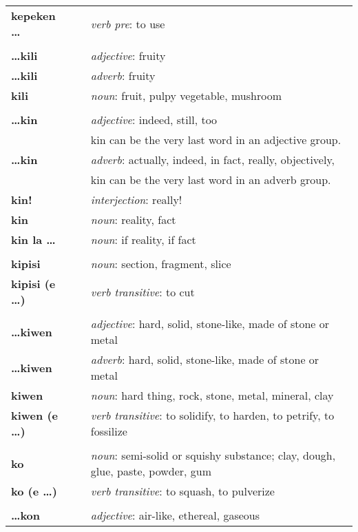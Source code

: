 \begin{supertabular}{p{2,5cm}|ll}
\textbf{kepeken \dots} && \textit{verb pre}: to use \\ 
 && \\ %
\textbf{\dots kili} && \textit{adjective}: fruity \\ 
\textbf{\dots kili} && \textit{adverb}: fruity \\ 
\textbf{kili} && \textit{noun}: fruit, pulpy vegetable, mushroom \\ 
 && \\ %
\textbf{\dots kin} && \textit{adjective}: indeed, still, too \\ && kin can be the very last word in an adjective group. \\ 
\textbf{\dots kin} && \textit{adverb}: actually, indeed, in fact, really, objectively, \\ && kin can be the very last word in an adverb group. \\
\textbf{kin!} && \textit{interjection}: really! \\ 
\textbf{kin} && \textit{noun}: reality, fact \\  
\textbf{kin la \dots} && \textit{noun}: if reality, if fact \\  
 && \\ %
\textbf{kipisi } && \textit{noun}: section, fragment, slice \\ 
\textbf{kipisi (e \dots)} && \textit{verb transitive}: to cut \\ 
 && \\ %
\textbf{\dots kiwen} && \textit{adjective}: hard, solid, stone-like, made of stone or metal \\ 
\textbf{\dots kiwen} && \textit{adverb}: hard, solid, stone-like, made of stone or metal \\ 
\textbf{kiwen} && \textit{noun}: hard thing, rock, stone, metal, mineral, clay \\ 
\textbf{kiwen (e \dots)} && \textit{verb transitive}: to solidify, to harden, to petrify, to fossilize \\ 
 && \\ %
\textbf{ko} && \textit{noun}: semi-solid or squishy substance; clay, dough, glue, paste, powder, gum \\ 
\textbf{ko (e \dots)} && \textit{verb transitive}: to squash, to pulverize \\ 
 && \\ %
\textbf{\dots kon} && \textit{adjective}: air-like, ethereal, gaseous \\ 

\end{supertabular}
